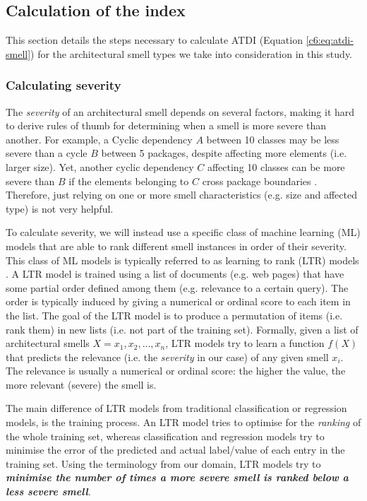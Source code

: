 \subsection{Calculation of the index}\label{label:index-calculation}
This section details the steps necessary to calculate ATDI (Equation \ref{c6:eq:atdi-smell}) for the architectural smell types we take into consideration in this study.

\subsubsection{Calculating severity}\label{c6:sec:calculating-severity}
The \emph{severity} of an architectural smell depends on several factors, making it hard to derive rules of thumb for determining when a smell is more severe than another.
For example, a Cyclic dependency $A$ between 10 classes may be less severe than a cycle $B$ between 5 packages, despite affecting more elements (i.e. larger size). Yet, another cyclic dependency $C$ affecting 10 classes can be more severe than $B$ if the elements belonging to $C$ cross package boundaries \cite{Laval2012}.
Therefore, just relying on one or more smell characteristics (e.g. size and affected type) is not very helpful.

To calculate severity, we will instead use a specific class of machine learning (ML) models that are able to rank different smell instances in order of their severity.
This class of ML models is typically referred to as learning to rank (LTR) models \cite{TieYan2009}.
A LTR model is trained using a list of documents (e.g. web pages) that have some partial order defined among them (e.g. relevance to a certain query).
The order is typically induced by giving a numerical or ordinal score to each item in the list.
The goal of the LTR model is to produce a permutation of items (i.e. rank them) in new lists (i.e. not part of the training set).
Formally, given a list of architectural smells $X = x_1,x_2,...,x_n$, LTR models try to learn a function $f(X)$ that predicts the relevance (i.e. the \emph{severity} in our case) of any given smell $x_i$.
The relevance is usually a numerical or ordinal score: the higher the value, the more relevant (severe) the smell is.

The main difference of LTR models from traditional classification or regression models, is the training process. An LTR model tries to optimise for the \emph{ranking} of the whole training set, whereas classification and regression models try to minimise the error of the predicted and actual label/value of each entry in the training set. 
Using the terminology from our domain, LTR models try to \textit{\textbf{minimise the number of times a more severe smell is ranked below a less severe smell}}.

